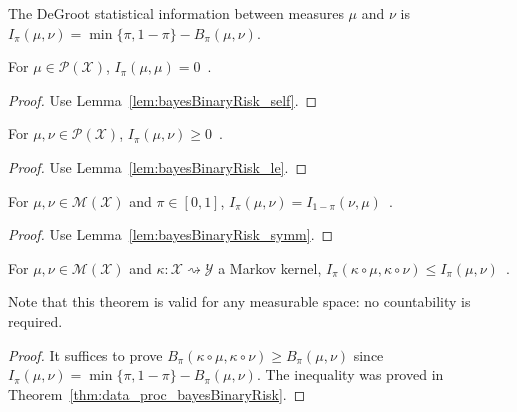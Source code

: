 \begin{definition}
  \label{def:deGrootInfo}
  The DeGroot statistical information between measures $\mu$ and $\nu$ is $I_\pi(\mu, \nu) = \min\{\pi, 1 - \pi\} - B_\pi(\mu, \nu)$.
\end{definition}

\begin{lemma}
  \label{lem:deGrootInfo_self}
  For $\mu \in \mathcal P(\mathcal X)$, $I_\pi(\mu, \mu) = 0$~.
\end{lemma}

\begin{proof}%
{}
Use Lemma~\ref{lem:bayesBinaryRisk_self}.
\end{proof}

\begin{lemma}
  \label{lem:deGrootInfo_nonneg}
  For $\mu, \nu \in \mathcal P(\mathcal X)$, $I_\pi(\mu, \nu) \ge 0$~.
\end{lemma}

\begin{proof}%
{}
Use Lemma~\ref{lem:bayesBinaryRisk_le}.
\end{proof}

\begin{lemma}
  \label{lem:deGrootInfo_symm}
  For $\mu, \nu \in \mathcal M(\mathcal X)$ and $\pi \in [0,1]$, $I_\pi(\mu, \nu) = I_{1 - \pi}(\nu, \mu)$~.
\end{lemma}

\begin{proof}%
{}
Use Lemma~\ref{lem:bayesBinaryRisk_symm}.
\end{proof}

\begin{theorem}
  \label{thm:data_proc_deGrootInfo}
  For $\mu, \nu \in \mathcal M(\mathcal X)$ and $\kappa : \mathcal X \rightsquigarrow \mathcal Y$ a Markov kernel, $I_\pi(\kappa \circ \mu, \kappa \circ \nu) \le I_\pi(\mu, \nu)$~.
\end{theorem}

Note that this theorem is valid for any measurable space: no countability is required.

\begin{proof}%
{}
It suffices to prove $B_\pi(\kappa \circ \mu, \kappa \circ \nu) \ge B_\pi(\mu, \nu)$ since $I_\pi(\mu, \nu) = \min\{\pi, 1 - \pi\} - B_\pi(\mu, \nu)$.
The inequality was proved in Theorem~\ref{thm:data_proc_bayesBinaryRisk}.
\end{proof}

